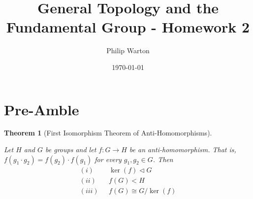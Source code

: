 \documentclass{article}
\newtheorem{theorem}{Theorem}[section]
\theoremstyle{definition}
\begin{document}
\title{General Topology and the Fundamental Group - Homework 2}
\author{Philip Warton}
\date{\today}
\maketitle
\section*{Pre-Amble}
    \begin{theorem}[First Isomorphism Theorem of Anti-Homomorphisms]
        \begin{mdframed}
            Let $H$ and $G$ be groups and let $f: G \rightarrow H$ be an anti-homomorphism.
            That is, $f(g_1\cdot g_2) = f(g_2)\cdot f(g_1)$ for every $g_1,g_2 \in G$. Then
            \begin{align*}
                (i) & \ \ \ \ker(f) \triangleleft G \\
                (ii) & \ \ \ f(G) < H \\
                (iii) & \ \ \ f(G) \cong G / \ker(f)
            \end{align*}
        \end{mdframed}
    \end{theorem}
\end{document}
